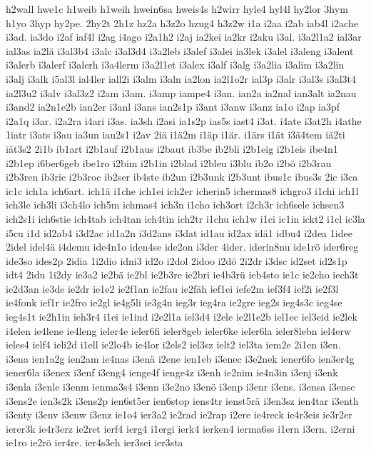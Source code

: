 {h2wall
hwe1c
h1weib
h1weih
hwein6sa
hweis4s
h2wirr
hyle4
hyl4l
hy2lor
3hym
h1yo
3hyp
hy2pe.
2hy2t
2h1z
hz2a
h3z2o
hzug4
h3z2w
i1a
i2aa
i2ab
iab4l
i2ache
i3ad.
ia3do
i2af
iaf4l
i2ag
i4ago
i2a1h2
i2aj
ia2kei
ia2kr
i2aku
i3al.
i3a2l1a2
ial3ar
ial3as
ia2lä
i3al3b4
i3alc
i3al3d4
i3a2leb
i3alef
i3alei
ia3lek
i3alel
i3aleng
i3alent
i3alerb
i3alerf
i3alerh
i3a4lerm
i3a2l1et
i3alex
i3alf
i3alg
i3a2lia
i3alim
i3a2lin
i3alj
i3alk
i5al3l
ial4ler
iall2i
i3alm
i3aln
ia2lon
ia2l1o2r
ial3p
i3alr
i3al3s
i3al3t4
ia2l3u2
i3alv
i3al3z2
i2am
i3am.
i3amp
iampe4
i3an.
ian2a
ia2nal
ian3alt
ia2nau
i3and2
ia2n1e2b
ian2er
i3anl
i3ans
ian2s1p
i3ant
i3anw
i3anz
ia1o
i2ap
ia3pf
i2a1q
i3ar.
i2a2ra
i4ari
i3as.
ia3sh
i2asi
ia1s2p
ias5s
iast4
i3at.
i4ate
i3at2h
i4athe
1iatr
i3ats
i3au
ia3un
iau2s1
i2av
2iä
i1ä2m
i1äp
i1är.
i1ärs
i1ät
i3ä4tem
iä2ti
iät3s2
2i1b
ib1art
i2b1auf
i2b1aus
i2baut
ib3be
ib2bli
i2b1eig
i2b1eis
ibe4n1
i2b1ep
i6ber6geb
ibe1ro
i2bim
i2b1in
i2blad
i2bleu
i3blu
ib2o
i2bö
i2b3rau
i2b3ren
ib3ric
i2b3roc
ib2ser
ib4ste
ib2un
i2b3unk
i2b3unt
ibus1c
ibus3s
2ic
i3ca
ic1c
ich1a
ich6art.
ich1ä
i1che
ich1ei
ich2er
icherin5
ichermas8
ichgro3
i1chi
ich1l
ich3le
ich3li
i3ch4lo
ich5m
ichmas4
ich3n
i1cho
ich3ort
i2ch3r
ich6sele
ichsen3
ich2s1i
ich6stie
ich4tab
ich4tan
ich4tin
ich2tr
i1chu
ich1w
i1ci
ic1in
ickt2
i1cl
ic3la
i5cu
i1d
id2ab4
i3d2ac
id1a2n
i3d2ans
i3dat
id1au
id2ax
idä1
idbu4
i2dea
1idee
2idel
idel4ä
i4demu
ide4n1o
iden4se
ide2on
i3der
4ider.
iderin8nu
ide1rö
ider6reg
ide3so
ides2p
2idia
1i2dio
idni3
id2o
i2dol
2idoo
i2dö
2i2dr
i3dsc
id2set
id2s1p
idt4
2idu
1i2dy
ie3a2
ie2bä
ie2bl
ie2b3re
ie2bri
ie4b3rü
ieb4sto
ie1c
ie2cho
iech3t
ie2d3an
ie3de
ie2dr
ie1e2
ie2f1an
ie2fau
ie2fäh
ief1ei
iefe2m
ief3f4
ief2i
ie2f3l
ie4fonk
ief1r
ie2fro
ie2gl
ie4g5li
ie3g4n
ieg3r
ieg4ra
ie2gre
ieg2s
ieg4s3c
ieg4se
ieg4s1t
ie2h1in
ieh3r4
i1ei
ie1ind
i2e2l1a
iel3d4
i2ele
ie2l1e2b
iel1ec
iel3eid
ie2lek
i4elen
ie4lene
ie4leng
ieler4e
ieler6fi
ieler8geb
ieler6ke
ieler6la
ieler8lebn
iel4erw
ieles4
ielf4
ieli2d
i1ell
ie2lo4b
ie4lor
i2els2
iel3sz
ielt2
iel3ta
iem2e
2i1en
i3en.
i3ena
ien1a2g
ien2am
ie4nas
i3enä
i2ene
ien1eb
i3enec
i3e2nek
iener6fo
ien3er4g
iener6la
i3enex
i3enf
i3eng4
ienge4f
ienge4z
i3enh
ie2nim
ie4n3in
i3enj
i3enk
i3enla
i3enle
i3enm
ienma3s4
i3enn
i3e2no
i3enö
i3enp
i3enr
i3ens.
i3ensa
i3ensc
i3ens2e
ien3s2k
i3ens2p
ien6st5er
ien6stop
iens4tr
ienst5rä
i3en3sz
ien4tar
i3enth
i3enty
i3env
i3enw
i3enz
ie1o4
ier3a2
ie2rad
ie2rap
i2ere
ie4reck
ie4r3eis
ie3r2er
ierer3k
ie4r3erz
ie2ret
ierf4
ierg4
i1ergi
ierk4
ierken4
ierma6ss
i1ern
i3ern.
i2erni
ie1ro
ie2rö
ier4re.
ier4s3eh
ier3sei
ier3sta
}
